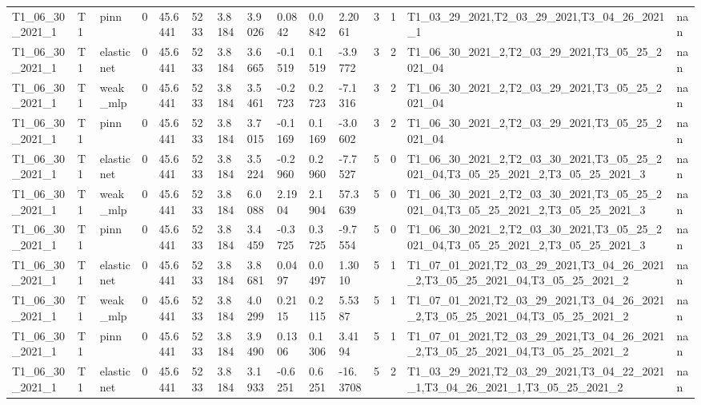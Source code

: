 \begin{table}[t]
\begin{tabular}{lllllllllllllll}
T1\_06\_30\_2021\_1 & T1 & pinn & 0 & 45.6441 & 5233 & 3.8184 & 3.9026 & 0.0842 & 0.0842 & 2.2061 & 3 & 1 & T1\_03\_29\_2021,T2\_03\_29\_2021,T3\_04\_26\_2021\_1 & nan \\
T1\_06\_30\_2021\_1 & T1 & elasticnet & 0 & 45.6441 & 5233 & 3.8184 & 3.6665 & -0.1519 & 0.1519 & -3.9772 & 3 & 2 & T1\_06\_30\_2021\_2,T2\_03\_29\_2021,T3\_05\_25\_2021\_04 & nan \\
T1\_06\_30\_2021\_1 & T1 & weak\_mlp & 0 & 45.6441 & 5233 & 3.8184 & 3.5461 & -0.2723 & 0.2723 & -7.1316 & 3 & 2 & T1\_06\_30\_2021\_2,T2\_03\_29\_2021,T3\_05\_25\_2021\_04 & nan \\
T1\_06\_30\_2021\_1 & T1 & pinn & 0 & 45.6441 & 5233 & 3.8184 & 3.7015 & -0.1169 & 0.1169 & -3.0602 & 3 & 2 & T1\_06\_30\_2021\_2,T2\_03\_29\_2021,T3\_05\_25\_2021\_04 & nan \\
T1\_06\_30\_2021\_1 & T1 & elasticnet & 0 & 45.6441 & 5233 & 3.8184 & 3.5224 & -0.2960 & 0.2960 & -7.7527 & 5 & 0 & T1\_06\_30\_2021\_2,T2\_03\_30\_2021,T3\_05\_25\_2021\_04,T3\_05\_25\_2021\_2,T3\_05\_25\_2021\_3 & nan \\
T1\_06\_30\_2021\_1 & T1 & weak\_mlp & 0 & 45.6441 & 5233 & 3.8184 & 6.0088 & 2.1904 & 2.1904 & 57.3639 & 5 & 0 & T1\_06\_30\_2021\_2,T2\_03\_30\_2021,T3\_05\_25\_2021\_04,T3\_05\_25\_2021\_2,T3\_05\_25\_2021\_3 & nan \\
T1\_06\_30\_2021\_1 & T1 & pinn & 0 & 45.6441 & 5233 & 3.8184 & 3.4459 & -0.3725 & 0.3725 & -9.7554 & 5 & 0 & T1\_06\_30\_2021\_2,T2\_03\_30\_2021,T3\_05\_25\_2021\_04,T3\_05\_25\_2021\_2,T3\_05\_25\_2021\_3 & nan \\
T1\_06\_30\_2021\_1 & T1 & elasticnet & 0 & 45.6441 & 5233 & 3.8184 & 3.8681 & 0.0497 & 0.0497 & 1.3010 & 5 & 1 & T1\_07\_01\_2021,T2\_03\_29\_2021,T3\_04\_26\_2021\_2,T3\_05\_25\_2021\_04,T3\_05\_25\_2021\_2 & nan \\
T1\_06\_30\_2021\_1 & T1 & weak\_mlp & 0 & 45.6441 & 5233 & 3.8184 & 4.0299 & 0.2115 & 0.2115 & 5.5387 & 5 & 1 & T1\_07\_01\_2021,T2\_03\_29\_2021,T3\_04\_26\_2021\_2,T3\_05\_25\_2021\_04,T3\_05\_25\_2021\_2 & nan \\
T1\_06\_30\_2021\_1 & T1 & pinn & 0 & 45.6441 & 5233 & 3.8184 & 3.9490 & 0.1306 & 0.1306 & 3.4194 & 5 & 1 & T1\_07\_01\_2021,T2\_03\_29\_2021,T3\_04\_26\_2021\_2,T3\_05\_25\_2021\_04,T3\_05\_25\_2021\_2 & nan \\
T1\_06\_30\_2021\_1 & T1 & elasticnet & 0 & 45.6441 & 5233 & 3.8184 & 3.1933 & -0.6251 & 0.6251 & -16.3708 & 5 & 2 & T1\_03\_29\_2021,T2\_03\_29\_2021,T3\_04\_22\_2021\_1,T3\_04\_26\_2021\_1,T3\_05\_25\_2021\_2 & nan \\

\end{tabular}
\end{table}
